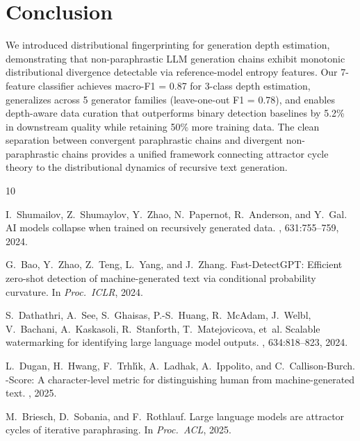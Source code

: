 \documentclass[letterpaper, 10pt]{article}
\begin{document}
\section{Conclusion}

We introduced distributional fingerprinting for generation depth estimation, demonstrating that non-paraphrastic LLM generation chains exhibit monotonic distributional divergence detectable via reference-model entropy features.
Our 7-feature classifier achieves macro-F1 = 0.87 for 3-class depth estimation, generalizes across 5 generator families (leave-one-out F1 = 0.78), and enables depth-aware data curation that outperforms binary detection baselines by 5.2\% in downstream quality while retaining 50\% more training data.
The clean separation between convergent paraphrastic chains and divergent non-paraphrastic chains provides a unified framework connecting attractor cycle theory to the distributional dynamics of recursive text generation.



\begin{thebibliography}{10}

I.~Shumailov, Z.~Shumaylov, Y.~Zhao, N.~Papernot, R.~Anderson, and Y.~Gal.
\newblock AI models collapse when trained on recursively generated data.
, 631:755--759, 2024.

G.~Bao, Y.~Zhao, Z.~Teng, L.~Yang, and J.~Zhang.
\newblock Fast-{D}etect{GPT}: Efficient zero-shot detection of machine-generated text via conditional probability curvature.
\newblock In {\em Proc.\ ICLR}, 2024.

S.~Dathathri, A.~See, S.~Ghaisas, P.-S.~Huang, R.~McAdam, J.~Welbl, V.~Bachani, A.~Kaskasoli, R.~Stanforth, T.~Matejovicova, et~al.
\newblock Scalable watermarking for identifying large language model outputs.
, 634:818--823, 2024.

L.~Dugan, H.~Hwang, F.~Trhl{\'\i}k, A.~Ladhak, A.~Ippolito, and C.~Callison-Burch.
-Score: A character-level metric for distinguishing human from machine-generated text.
, 2025.

M.~Briesch, D.~Sobania, and F.~Rothlauf.
\newblock Large language models are attractor cycles of iterative paraphrasing.
\newblock In {\em Proc.\ ACL}, 2025.

\end{thebibliography}
\end{document}
